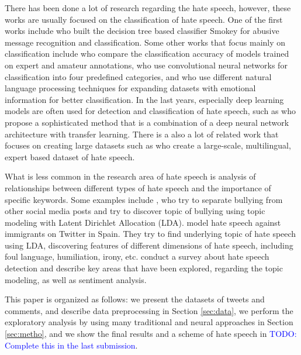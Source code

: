 \documentclass[fleqn,moreauthors,10pt]{ds_report}
\begin{document}
There has been done a lot of research regarding the hate speech, however, these works are usually focused on the classification of hate speech. One of the first works include \cite{spertus1997smokey} who built the decision tree based classifier Smokey for abusive message recognition and classification. Some other works that focus mainly on classification include \cite{waseem2016you} who compare the classification accuracy of models trained on expert and amateur annotations, \cite{gamback2017using} who use convolutional neural networks for classification into four predefined categories, and \cite{martins2018hate} who use different natural language processing techniques for expanding datasets with emotional information for better classification. In the last years, especially deep learning models are often used for detection and classification of hate speech, such as \cite{rizoiu2019transfer} who propose a sophisticated method that is a combination of a deep neural network architecture with transfer learning.
There is a also a lot of related work that focuses on creating large datasets such as \cite{chung2019conan} who create a large-scale, multilingual, expert based dataset of hate speech. 

What is less common in the research area of hate speech is analysis of relationships between different types of hate speech and the importance of specific keywords. Some examples include \cite{xu2012learning}, who try to separate bullying from other social media posts and try to discover topic of bullying using topic modeling with Latent Dirichlet Allocation (LDA). \cite{calderon2020topic} model hate speech against immigrants on Twitter in Spain. They try to find underlying topic of hate speech using LDA, discovering features of different dimensions of hate speech, including foul language, humiliation, irony, etc. \cite{schmidt2017survey} conduct a survey about hate speech detection and describe key areas that have been explored, regarding the topic modeling, as well as sentiment analysis.

This paper is organized as follows: we present the datasets of tweets and comments, and describe data preprocessing in Section \ref{sec:data}, we perform the exploratory analysis by using many traditional and neural approaches in Section \ref{sec:metho}, and we show the final results and a scheme of hate speech in \textcolor{blue}{TODO: Complete this in the last submission}.

\end{document}
